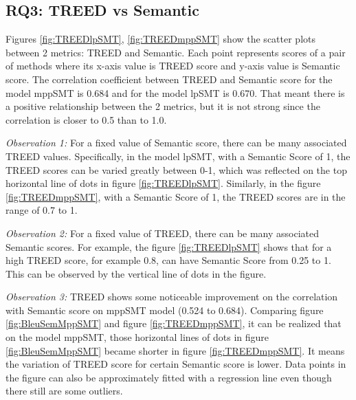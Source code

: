 \subsection{RQ3: TREED vs Semantic}
Figures \ref{fig:TREEDlpSMT}, \ref{fig:TREEDmppSMT}  show the scatter plots between 2 metrics: TREED and Semantic. Each point represents scores of a pair of methods where its x-axis value is TREED score and y-axis value is Semantic score.
The correlation coefficient between TREED and Semantic score for the model mppSMT is 0.684 and for the model lpSMT is 0.670. That meant there is a positive relationship between the 2 metrics, but it is not strong since the correlation is closer to 0.5 than to 1.0.

\emph{Observation 1:} For a fixed value of Semantic score, there can be many associated TREED values. Specifically, in the model lpSMT, with a Semantic Score of 1, the TREED scores can be varied greatly between 0-1, which was reflected on the top horizontal line of dots in figure \ref{fig:TREEDlpSMT}. Similarly, in the figure \ref{fig:TREEDmppSMT}, with a Semantic Score of 1, the TREED scores are in the range of 0.7 to 1. 

\emph{Observation 2:} For a fixed value of TREED, there can be many associated Semantic scores. For example, the figure \ref{fig:TREEDlpSMT} shows that for a high TREED score, for example 0.8, can have Semantic Score from 0.25 to 1. This can be observed by the vertical line of dots in the figure. 

\emph{Observation 3:} TREED shows some noticeable improvement on the correlation with Semantic score on mppSMT model (0.524 to 0.684). Comparing figure \ref{fig:BleuSemMppSMT} and figure \ref{fig:TREEDmppSMT}, it can be realized that on the model mppSMT, those horizontal lines of dots in figure \ref{fig:BleuSemMppSMT} became shorter in figure \ref{fig:TREEDmppSMT}. It means the variation of TREED score for certain Semantic score is lower. Data points in the figure can also be approximately fitted with a regression line even though there still are some outliers. 

